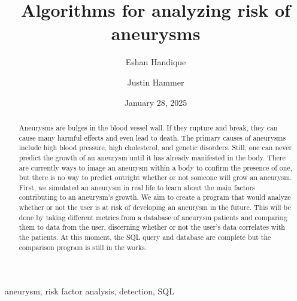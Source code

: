 ﻿\documentclass[12pt,conference,onecolumn]{IEEEtran}
\title{Algorithms for analyzing risk of aneurysms}
\author{Eshan Handique \and Justin Hammer}
\date{January 28, 2025}
\newcommand{\keywords}{aneurysm, risk factor analysis, detection, SQL}
\begin{document}
\maketitle 

\begin{abstract}
Aneurysms are bulges in the blood vessel wall. If they rupture and break, they can cause many harmful effects and even lead to death. The primary causes of aneurysms include high blood pressure, high cholesterol, and genetic disorders. Still, one can never predict the growth of an aneurysm until it has already manifested in the body. There are currently ways to image an aneurysm within a body to confirm the presence of one, but there is no way to predict outright whether or not someone will grow an aneurysm. First, we simulated an aneurysm in real life to learn about the main factors contributing to an aneurysm's growth. We aim to create a program that would analyze whether or not the user is at risk of developing an aneurysm in the future. This will be done by taking different metrics from a database of aneurysm patients and comparing them to data from the user, discerning whether or not the user’s data correlates with the patients. At this moment, the SQL query and database are complete but the comparison program is still in the works.
\end{abstract}

\begin{IEEEkeywords}
\keywords
\end{IEEEkeywords}
\end{document}
